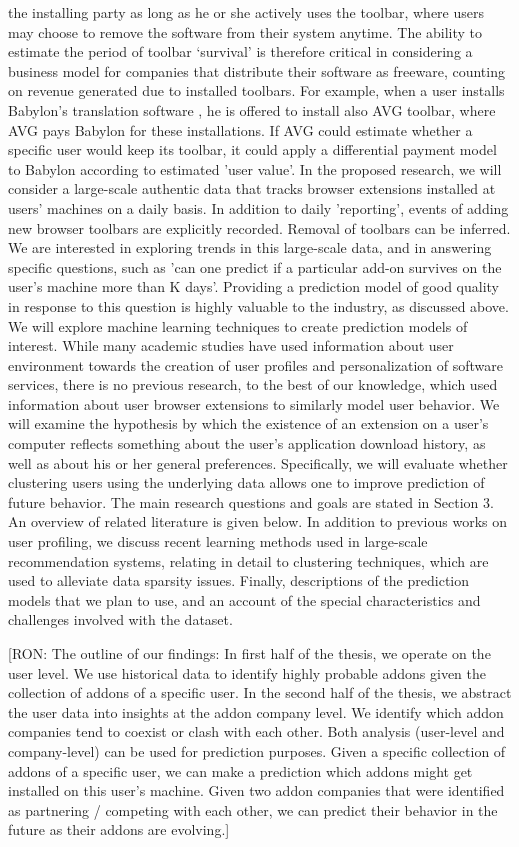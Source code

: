 \documentclass[11pt,oneside]{book}
\begin{document}
the installing party as long as he or she actively uses the toolbar, where users may choose to remove the software from their system anytime. The ability to estimate the period of toolbar ‘survival’ is therefore critical in considering a business model for companies that distribute their software as freeware, counting on revenue generated due to installed toolbars. For example, when a user installs Babylon's translation software , he is offered to install also AVG toolbar, where AVG pays Babylon for these installations. If AVG could estimate whether a specific user would keep its toolbar, it could apply a differential payment model to Babylon according to estimated 'user value'.  In the proposed research, we will consider a large-scale authentic data that tracks browser extensions installed at users' machines on a daily basis. In addition to daily 'reporting', events of adding new browser toolbars are explicitly recorded. Removal
of toolbars can be inferred. We are interested in exploring trends in this large-scale data, and in answering specific questions, such as 'can one predict if a particular add-on survives on the user's machine
more than K days'. Providing a prediction model of good quality in response to this question is highly valuable to the industry, as discussed above. We will explore machine learning techniques to create prediction models of interest. While many academic studies have used information about user environment towards the creation of user
profiles and personalization of software services, there is no previous research, to the best of our knowledge, which used information about user browser extensions to similarly model user behavior. We will examine the hypothesis by which the existence of an extension on a user’s computer reflects something about the user's
application download history, as well as about his or her general preferences. Specifically, we will evaluate whether clustering users using the underlying data allows one to improve prediction of future behavior. The main research questions and goals are stated in Section 3. An overview of related literature is given below. In addition to previous works on user profiling, we discuss recent learning methods used in large-scale recommendation systems, relating in detail to clustering techniques, which are used to alleviate data sparsity
issues. Finally, descriptions of the prediction models that we plan to use, and an account of the special characteristics and challenges involved with the dataset.

[RON: The outline of our findings: In first half of the thesis, we operate on the user level. We use historical data to identify highly probable addons given the collection of addons of a specific user. In the second half of the thesis, we abstract the user data into insights at the addon company level. We identify which addon companies tend to coexist or clash with each other. Both analysis (user-level and company-level) can be used for prediction purposes. Given a specific collection of addons of a specific user, we can make a prediction which addons might get installed on this user's machine. Given two addon companies that were identified as partnering / competing with each other, we can predict their behavior in the future as their addons are evolving.]
\end{document}
